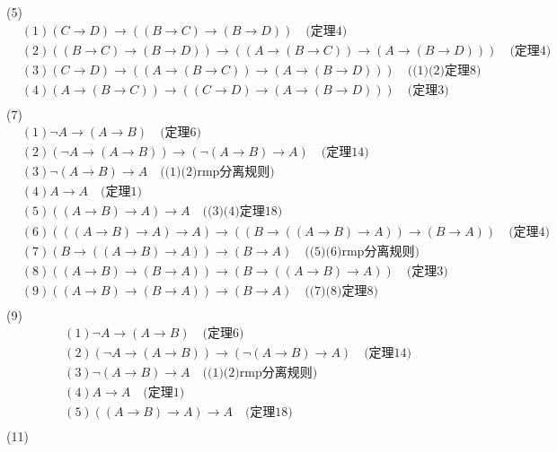 \documentclass{article}
\begin{document}
(5)
\[
\begin{aligned}
&(1)(C \to D) \to ((B \to C) \to (B \to D)) \quad \mbox{(定理4)}\\
&(2)((B \to C) \to (B \to D)) \to ((A \to (B \to C)) \to (A \to (B \to D)))\quad \mbox{(定理4)} \\
&(3)(C \to D) \to ((A \to (B \to C)) \to (A \to (B \to D))) \quad \mbox{((1)(2)定理8)}\\
&(4)(A \to (B \to C)) \to ((C \to D) \to (A \to (B \to D)))\quad \mbox{(定理3)}\\
\end{aligned}
\]
(7)
\[
\begin{aligned}
&(1)\neg A \to (A \to B) \quad \mbox{(定理6)}\\
&(2)(\neg A \to (A \to B)) \to (\neg (A \to B) \to A)  \quad \mbox{(定理14)} \\
&(3)\neg (A \to B) \to A \quad \mbox{((1)(2)rmp分离规则)}\\
&(4)A \to A \quad \mbox{(定理1)}\\
&(5)((A \to B) \to A) \to A \quad \mbox{((3)(4)定理18)} \\
&(6)(((A \to B) \to A) \to A) \to ((B \to ((A \to B) \to A)) \to (B \to A)) \quad \mbox{(定理4)} \\
&(7)(B \to ((A \to B) \to A)) \to (B \to A) \quad \mbox{((5)(6)rmp分离规则)} \\
&(8)((A \to B) \to (B \to A)) \to (B \to ((A \to B) \to A)) \quad \mbox{(定理3)} \\
&(9)((A \to B) \to (B \to A)) \to (B \to A) \quad \mbox{((7)(8)定理8)} \\
\end{aligned}
\]
(9)
\[
\begin{aligned}
&(1)\neg A \to (A \to B) \quad \mbox{(定理6)}\\
&(2)(\neg A \to (A \to B)) \to (\neg (A \to B) \to A)  \quad \mbox{(定理14)} \\
&(3)\neg (A \to B) \to A \quad \mbox{((1)(2)rmp分离规则)}\\
&(4)A \to A \quad \mbox{(定理1)}\\
&(5)((A \to B) \to A) \to A \quad \mbox{(定理18)}\\
\end{aligned}
\]
(11)
\end{document}
